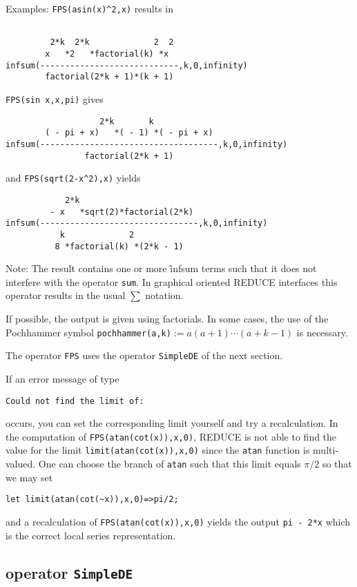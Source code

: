 Examples: {\tt FPS(asin(x)\verb+^+2,x)} results in
\begin{verbatim}

         2*k  2*k             2  2
        x   *2   *factorial(k) *x
infsum(----------------------------,k,0,infinity)
        factorial(2*k + 1)*(k + 1)
\end{verbatim}
{\tt FPS(sin x,x,pi)} gives
\begin{verbatim}
                   2*k       k
        ( - pi + x)   *( - 1) *( - pi + x)
infsum(------------------------------------,k,0,infinity)
                factorial(2*k + 1)
\end{verbatim}
and {\tt FPS(sqrt(2-x\verb+^+2),x)} yields
\begin{verbatim}
            2*k
         - x   *sqrt(2)*factorial(2*k)
infsum(--------------------------------,k,0,infinity)
           k             2
          8 *factorial(k) *(2*k - 1)
\end{verbatim}
\hypertarget{operator:INFSUM}{}
Note: The result contains one or more \f{infsum} terms such that it does
not interfere with the {\REDUCE} operator {\tt sum}. In graphical oriented
REDUCE interfaces this operator results in the usual $\sum$ notation.

If possible, the output is given using factorials. In some cases, the
use of the Pochhammer symbol {\tt pochhammer(a,k)}$:=a(a+1)\cdots(a+k-1)$
is necessary.

The operator {\tt FPS} uses the operator {\tt SimpleDE} of the next section.

If an error message of type
\begin{verbatim}
Could not find the limit of:
\end{verbatim}
occurs, you can set the corresponding limit yourself and try a
recalculation. In the computation of {\tt FPS(atan(cot(x)),x,0)},
REDUCE is not able to find the value for the limit 
{\tt limit(atan(cot(x)),x,0)} since the {\tt atan} function is multi-valued.
One can choose the branch of {\tt atan} such that this limit equals
$\pi/2$ so that we may set 
\begin{verbatim}
let limit(atan(cot(~x)),x,0)=>pi/2;
\end{verbatim}
and a recalculation of {\tt FPS(atan(cot(x)),x,0)}
yields the output {\tt pi - 2*x} which is
the correct local series representation.

\subsection{\REDUCE{} operator {\tt SimpleDE}}
\hypertarget{operator:SIMPLEDE}{}

